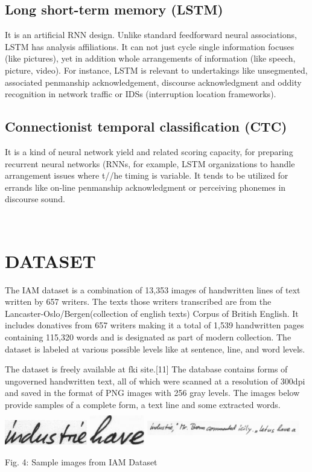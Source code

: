 \documentclass[12pt, conference]{IEEEtran}
\begin{document}
\subsection{\textbf{Long short-term memory (LSTM)}}
It is an artificial RNN design. Unlike standard feedforward neural associations, LSTM has analysis affiliations. It can not just cycle single information focuses (like pictures), yet in addition whole arrangements of information (like speech, picture, video). For instance, LSTM is relevant to undertakings like unsegmented, associated penmanship acknowledgement, discourse acknowledgment and oddity recognition in network traffic or IDSs (interruption location frameworks).

\subsection{\textbf{Connectionist temporal classification (CTC)}}
It is a kind of neural network yield and related scoring capacity, for preparing recurrent neural networks (RNNs, for example, LSTM organizations to handle arrangement issues where t//he timing is variable. It tends to be utilized for errands like on-line penmanship acknowledgment or perceiving phonemes in discourse sound.

\textbf{\\}
\section{\textbf{DATASET}}
The IAM dataset is a combination of 13,353 images of handwritten lines of text written by 657 writers. The texts those writers transcribed are from the Lancaster-Oslo/Bergen(collection of english texts) Corpus of British English. It includes donatives from 657 writers making it a total of 1,539 handwritten pages containing 115,320 words and is designated as part of modern collection.  The dataset is labeled at various possible levels like at sentence, line, and word levels.

The dataset is freely available at fki site.[11] The database contains forms of ungoverned handwritten text, all of which were scanned at a resolution of 300dpi and saved in the format of PNG images with 256 gray levels. The images below provide samples of a complete form, a text line and some extracted words.\\
\includegraphics[width=0.27\textwidth]{img5.jpg} \includegraphics[width=0.18\textwidth]{img6.jpg}
\includegraphics[width=0.5\textwidth, height=1.5cm]{img4.jpg}
\begin{center}
    Fig. 4: Sample images from IAM Dataset
\end{center}
\end{document}
